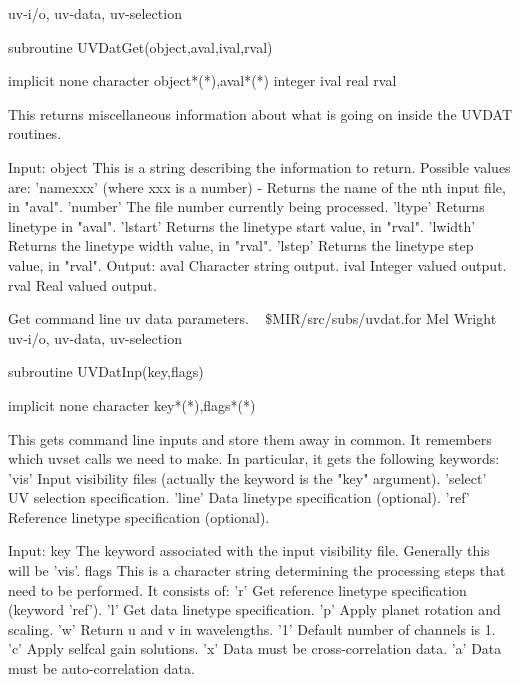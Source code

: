 \newline {} uv-i/o, uv-data, uv-selection
\par{\tenpoint
{\eightpoint\begintt
        subroutine UVDatGet(object,aval,ival,rval)

        implicit none
        character object*(*),aval*(*)
        integer ival
        real rval

  This returns miscellaneous information about what is going on inside
  the UVDAT routines.

  Input:
    object     This is a string describing the information to return.
               Possible values are:
                'namexxx' (where xxx is a number) - Returns the name of
                          the nth input file, in "aval".
                'number'  The file number currently being processed.
                'ltype'   Returns linetype in "aval".
                'lstart'  Returns the linetype start value, in "rval".
                'lwidth'  Returns the linetype width value, in "rval".
                'lstep'   Returns the linetype step  value, in "rval".
  Output:
    aval       Character string output.
    ival       Integer valued output.
    rval       Real valued output.
\endtt}
\par}
%
\noindent Get command line uv data parameters.
\newline \ 
\newline {} \$MIR/src/subs/uvdat.for
\newline {} Mel Wright
\newline {} uv-i/o, uv-data, uv-selection
\par{\tenpoint
{\eightpoint\begintt
        subroutine UVDatInp(key,flags)

        implicit none
        character key*(*),flags*(*)

  This gets command line inputs and store them away in common. It remembers
  which uvset calls we need to make. In particular, it gets the following
  keywords:
    'vis'      Input visibility files (actually the keyword is the "key"
               argument).
    'select'   UV selection specification.
    'line'     Data linetype specification (optional).
    'ref'      Reference linetype specification (optional).

  Input:
    key        The keyword associated with the input visibility file.
               Generally this will be 'vis'.
    flags      This is a character string determining the processing steps
               that need to be performed. It consists of:
                'r'    Get reference linetype specification (keyword 'ref').
                'l'    Get data linetype specification.
                'p'    Apply planet rotation and scaling.
                'w'    Return u and v in wavelengths.
                '1'    Default number of channels is 1.
                'c'    Apply selfcal gain solutions.
                'x'    Data must be cross-correlation data.
                'a'    Data must be auto-correlation data.
\endtt}
\par}
